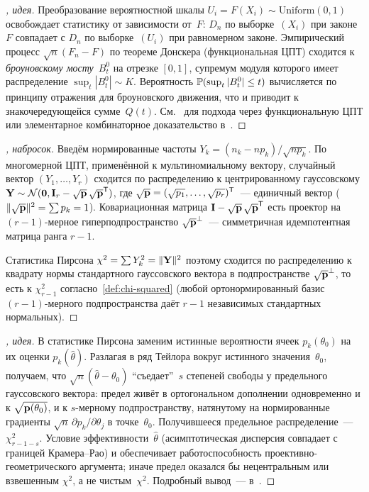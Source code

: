 \begin{proof}[, идея]
Преобразование вероятностной шкалы $U_i = F(X_i) \sim \mathrm{Uniform}(0, 1)$ освобождает статистику от зависимости от~$F$: $D_n$ по выборке~$(X_i)$ при законе~$F$ совпадает с $D_n$ по выборке~$(U_i)$ при равномерном законе. Эмпирический процесс $\sqrt n (F_n - F)$ по теореме Донскера (функциональная ЦПТ) сходится к \emph{броуновскому мосту}~$B^0_t$ на отрезке $[0, 1]$, супремум модуля которого имеет распределение $\sup_t |B^0_t| \sim K$. Вероятность $\mathbb{P}(\sup_t |B^0_t| \leq t)$ вычисляется по принципу отражения для броуновского движения, что и приводит к знакочередующейся сумме~$Q(t)$. См.~\cite[гл.~XII]{Shiryaev1989} для подхода через функциональную ЦПТ или элементарное комбинаторное доказательство в~\cite[гл.~IX]{Sevastyanov1982}.
\end{proof}

\begin{proof}[, набросок]
Введём нормированные частоты $Y_k = (n_k - n p_k)/\sqrt{n p_k}$. По многомерной ЦПТ, применённой к мультиномиальному вектору, случайный вектор $(Y_1, \dots, Y_r)$ сходится по распределению к центрированному гауссовскому $\mathbf{Y} \sim \mathcal{N}(\mathbf{0}, \mathbf{I}_r - \sqrt{\mathbf{p}}\,\sqrt{\mathbf{p}}^{\mathsf{T}})$, где $\sqrt{\mathbf{p}} = (\sqrt{p_1}, \dots, \sqrt{p_r})^{\mathsf{T}}$~--- единичный вектор ($\|\sqrt{\mathbf{p}}\|^2 = \sum p_k = 1$). Ковариационная матрица $\mathbf{I} - \sqrt{\mathbf{p}}\,\sqrt{\mathbf{p}}^{\mathsf{T}}$ есть проектор на $(r - 1)$-мерное гиперподпространство $\sqrt{\mathbf{p}}^{\perp}$~--- симметричная идемпотентная матрица ранга $r - 1$.

Статистика Пирсона $\chi^2 = \sum Y_k^2 = \|\mathbf{Y}\|^2$ поэтому сходится по распределению к квадрату нормы стандартного гауссовского вектора в подпространстве $\sqrt{\mathbf{p}}^{\perp}$, то есть к $\chi^2_{r - 1}$ согласно~\cref{def:chi-squared} (любой ортонормированный базис $(r-1)$-мерного подпространства даёт $r - 1$ независимых стандартных нормальных).
\end{proof}

\begin{proof}[, идея]
В статистике Пирсона заменим истинные вероятности ячеек $p_k(\theta_0)$ на их оценки $p_k(\hat \theta)$. Разлагая в ряд Тейлора вокруг истинного значения~$\theta_0$, получаем, что $\sqrt n (\hat \theta - \theta_0)$ ``съедает''~$s$ степеней свободы у предельного гауссовского вектора: предел живёт в ортогональном дополнении одновременно и к $\sqrt{\mathbf{p}(\theta_0)}$, и к $s$-мерному подпространству, натянутому на нормированные градиенты $\sqrt{n}\, \partial p_k/\partial \theta_j$ в точке~$\theta_0$. Получившееся предельное распределение~--- $\chi^2_{r - 1 - s}$. Условие эффективности~$\hat \theta$ (асимптотическая дисперсия совпадает с границей Крамера--Рао) и обеспечивает работоспособность проективно-геометрического аргумента; иначе предел оказался бы нецентральным или взвешенным $\chi^2$, а не чистым~$\chi^2$. Подробный вывод~--- в~\cite[гл.~IX, \S~3]{Sevastyanov1982}.
\end{proof}

